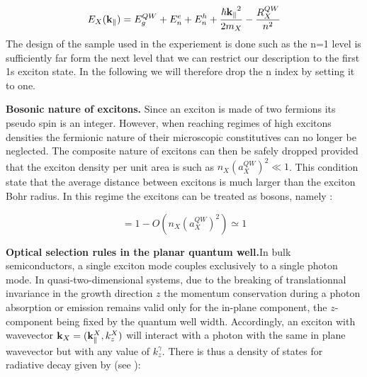\begin{equation}
    E_X(\mathbf{k}_\parallel) = E_g^{QW} + E_n^{e} + E_n^{h} +  \dfrac{\mathbf{\hbar k_{\parallel}}^2}{2m_X} - \dfrac{R_X^{QW}}{n^2}
    \label{eq:2D_exciton_energy}
\end{equation}
The design of the sample used in the experiement is done such as the n=1 level is sufficiently far form the next level that we can restrict our description to 
the first 1s exciton state. In the following we will therefore drop the n index by setting it to one.

\bigskip


\noindent \textbf{Bosonic nature of excitons.} Since an exciton is made of two fermions its pseudo spin is an integer. However, when reaching regimes of high excitons densities
the fermionic nature of their microscopic constitutives can no longer be neglected. The composite nature of excitons can then be safely dropped provided that the exciton density per unit area 
is such as $n_X(a_X^{QW})^2 \ll 1$. This condition state that the average distance between excitons is much larger than the exciton Bohr radius. In this regime the excitons can be treated as bosons, namely : 


\begin{equation}
    [b_{\mathbf{k}}, b^{\dagger}_{\mathbf{k}}] = 1 - O(n_X(a_X^{QW})^2) \simeq 1
    \label{eq:exciton_bosonic_nature}
\end{equation}

\bigskip



\noindent \textbf{Optical selection rules in the planar quantum well.}In bulk semiconductors, a single exciton mode couples exclusively to a single photon mode. In quasi-two-dimensional systems, due to the breaking of translationnal invariance in the growth direction $z$ the momentum
conservation during a photon absorption or emission remains valid only for the in-plane component, the $z$-component being fixed by the quantum well width.
Accordingly, an exciton with wavevector $\mathbf{k}_X=(\mathbf{k}_\parallel^X, k_z^X)$ will interact with a photon with the same in plane wavevector but with any value of $k_z^\gamma$. 
There is thus a density of states for radiative decay given by (see \cite{weisbuch_microcavities_1996}):

